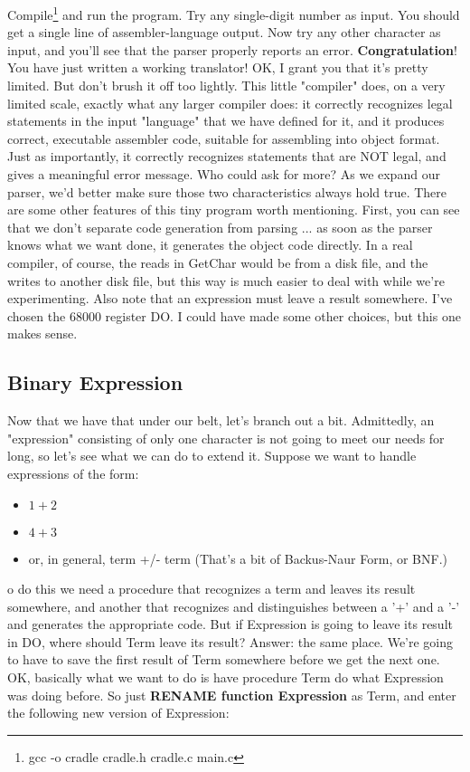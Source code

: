 Compile\footnote{gcc -o cradle cradle.h cradle.c main.c} and run the program.
 Try any single-digit number as input. You
should get a single line of assembler-language output. Now try
any other character as input, and you'll see that the parser
properly reports an error. \textbf{Congratulation}!  You have just written a working translator!
OK, I grant you that it's pretty limited. But don't brush it off
too lightly. This little "compiler" does, on a very limited scale, exactly what any larger compiler does: it correctly
recognizes legal statements in the input "language" that we have
defined for it, and it produces correct, executable assembler
code, suitable for assembling into object format. Just as
importantly, it correctly recognizes statements that are NOT
legal, and gives a meaningful error message. Who could ask for
more? As we expand our parser, we'd better make sure those two
characteristics always hold true.
There are some other features of this tiny program worth
mentioning. First, you can see that we don't separate code
generation from parsing ... as soon as the parser knows what we
want done, it generates the object code directly. In a real
compiler, of course, the reads in GetChar would be from a disk
file, and the writes to another disk file, but this way is much
easier to deal with while we're experimenting.
Also note that an expression must leave a result somewhere. I've
chosen the 68000 register DO. I could have made some other
choices, but this one makes sense.

\subsection{Binary Expression}
Now that we have that under our belt, let's branch out a bit.
Admittedly, an "expression" consisting of only one character is
not going to meet our needs for long, so let's see what we can do
to extend it. Suppose we want to handle expressions of the form:
\begin{itemize}
  \item \(1+2\)
  \item \(4+3\)
  \item or, in general, term +/- term (That's a bit of Backus-Naur Form, or
  BNF.)
\end{itemize}

o do this we need a procedure that recognizes a term and leaves
its result somewhere, and another that recognizes and
distinguishes between a '+' and a '-' and generates the
appropriate code. But if Expression is going to leave its result
in DO, where should Term leave its result? Answer: the same
place. We're going to have to save the first result of Term
somewhere before we get the next one.
OK, basically what we want to do is have procedure Term do what
Expression was doing before. So just \textbf{RENAME function Expression}
as Term, and enter the following new version of Expression:

